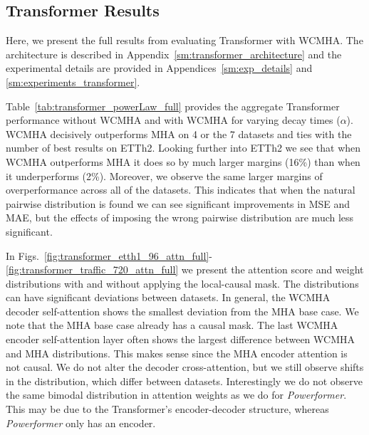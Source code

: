 \subsection{Transformer Results}
\label{sm:experiments_transformer_results}

Here, we present the full results from evaluating Transformer with WCMHA.
The architecture is described in Appendix~\ref{sm:transformer_architecture} and the experimental details are provided in Appendices~\ref{sm:exp_details} and \ref{sm:experiments_transformer}.

Table~\ref{tab:transformer_powerLaw_full} provides the aggregate Transformer performance without WCMHA and with WCMHA for varying decay times ($\alpha$).
WCMHA decisively outperforms MHA on 4 or the 7 datasets and ties with the number of best results on ETTh2.
Looking further into ETTh2 we see that when WCMHA outperforms MHA it does so by much larger margins (16\%) than when it underperforms (2\%).
Moreover, we observe the same larger margins of overperformance across all of the datasets.
This indicates that when the natural pairwise distribution is found we can see significant improvements in MSE and MAE, but the effects of imposing the wrong pairwise distribution are much less significant.

In Figs.~\ref{fig:transformer_etth1_96_attn_full}-\ref{fig:transformer_traffic_720_attn_full} we present the attention score and weight distributions with and without applying the local-causal mask.
The distributions can have significant deviations between datasets.
In general, the WCMHA decoder self-attention shows the smallest deviation from the MHA base case.
We note that the MHA base case already has a causal mask.
The last WCMHA encoder self-attention layer often shows the largest difference between WCMHA and MHA distributions.
This makes sense since the MHA encoder attention is not causal.
We do not alter the decoder cross-attention, but we still observe shifts in the distribution, which differ between datasets.
Interestingly we do not observe the same bimodal distribution in attention weights as we do for \emph{Powerformer}.
This may be due to the Transformer's encoder-decoder structure, whereas \emph{Powerformer} only has an encoder.


